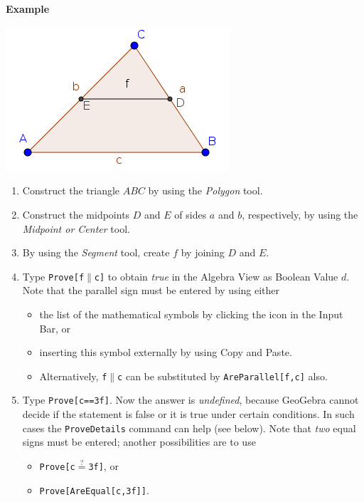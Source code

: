 \documentclass{article}
\begin{document}
\paragraph{Example}
\begin{center}
\includegraphics[scale=0.5]{Prove-example}
\end{center}
\begin{enumerate}
\item Construct the triangle $ABC$ by using the \textit{Polygon} tool.
\item Construct the midpoints $D$ and $E$ of sides $a$ and $b$, respectively, by using the \textit{Midpoint or Center} tool.
\item By using the \textit{Segment} tool, create $f$ by joining $D$ and $E$.
\item Type \texttt{Prove[f$\parallel$c]} to obtain \textit{true} in the Algebra View as Boolean Value $d$. Note that the parallel sign must be entered by using either
\begin{itemize}
\item the list of the mathematical symbols by clicking the \framebox{$\alpha$} icon in the Input Bar, or
\item inserting this symbol externally by using Copy and Paste.
\item Alternatively, \texttt{f$\parallel$c} can be substituted by \texttt{AreParallel[f,c]} also.
\end{itemize}

\item Type \texttt{Prove[c==3f]}. Now the answer is \textit{undefined}, because GeoGebra cannot decide if the statement is false or it is true under certain conditions. In such cases the \texttt{ProveDetails} command can help (see below). Note that \textit{two} equal signs must be entered; another possibilities are to use
\begin{itemize}
    \item \texttt{Prove[c$\stackrel{?}{=}$3f]}, or
    \item \texttt{Prove[AreEqual[c,3f]]}.
\end{itemize}

\end{enumerate}
\end{document}
